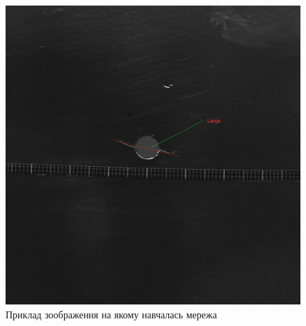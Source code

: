 \documentclass[a4paper, 14pt]{article}
\numberwithin{equation}{section}
\numberwithin{table}{section}
\begin{document}
\begin{figure}[!h]
	\centerline{\includegraphics[scale=.7]{res/image5.png}}
	\caption{Приклад зоображення на якому навчалась мережа}
	\label{fig5}
\end{figure}

\newpage
\end{document}
